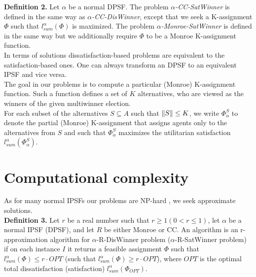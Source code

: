 \noindent
\textbf{Definition 2.} Let $\alpha$ be a normal DPSF. The problem $\alpha$\textit{-CC-SatWinner} is defined in the same way as $\alpha$\textit{-CC-DisWinner}, except that we seek a K-assignment $\Phi$ such that $l^{\alpha}_{sum}(\Phi)$ is maximized. The problem $\alpha$\textit{-Monroe-SatWinner} is defined in the same way but we additionally require $\Phi$ to be a Monroe K-assignment function.
\\

In terms of solutions dissatisfaction-based problems are equivalent to the satisfaction-based ones. One can always transform an DPSF to an equivalent IPSF and vice versa.
\\

The goal in our problems is to compute a particular (Monroe) K-assignment function. Such a function defines a set of $K$ alternatives, who are viewed as the winners of the given multiwinner election.
\\

For each subset of the alternatives $S \subseteq A$ such that $\lVert S\rVert \leq K$, we write $\Phi^{S}_{\alpha}$ to denote the partial (Monroe) K-assignment that assigns agents only to the alternatives from $S$ and such that $\Phi^{S}_{\alpha}$ maximizes the utilitarian satisfaction $l^{\alpha}_{sum}(\Phi^{S}_{
\alpha})$.

\section{Computational complexity}

As for many normal IPSFs our problems are NP-hard \cite{2}, we seek approximate solutions.
\\

\noindent
\textbf{Definition 3.} Let $r$ be a real number such that $r \geq 1 (0 < r \leq 1)$, let $\alpha$ be a normal IPSF (DPSF), and let $R$ be either Monroe or CC. An algorithm is an r-approximation algorithm for $\alpha$-R-DisWinner problem ($\alpha$-R-SatWinner problem) if on each instance $I$ it returns a feasible assignment $\Phi$ such that $l^{\alpha}_{sum}(\Phi) \leq r \cdot OPT$ (such that $l^{\alpha}_{sum}(\Phi) \geq r \cdot OPT$), where $OPT$ is the optimal total dissatisfaction (satisfaction) $l^{\alpha}_{sum}(\Phi_{OPT})$.
\\
